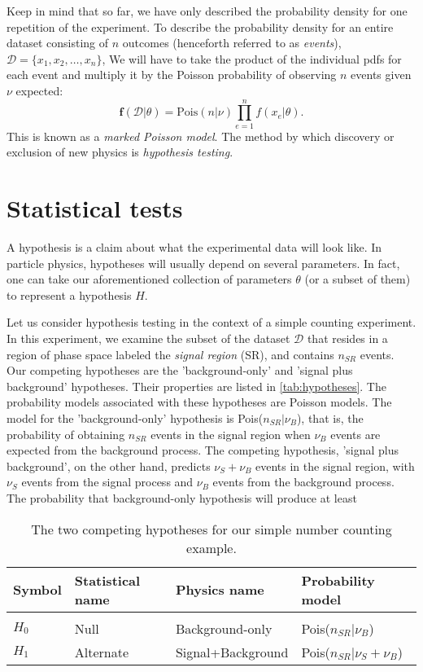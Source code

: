 Keep in mind that so far, we have only described the probability density for one repetition of the experiment. To describe the probability density for an entire dataset consisting of $n$ outcomes (henceforth referred to as \emph{events}), $\mathcal{D} = \{x_1,x_2,\dots,x_n\}$, We will have to take the product of the individual pdfs for each event and multiply it by the Poisson probability of observing $n$ events given $\nu$ expected: 
\[\mathbf{f}(\mathcal{D}|\mathbb{\theta}) = \text{Pois}(n|\nu)\prod_{e=1}^{n}f(x_e|\mathbb{\theta}).\]
This is known as a \emph{marked Poisson model}.
The method by which discovery or exclusion of new physics is \emph{hypothesis testing}. 
\section{Statistical tests}

A hypothesis is a claim about what the experimental data will look like. In particle physics, hypotheses will usually depend on several parameters. In fact, one can take our aforementioned collection of parameters $\mathbb{\theta}$ (or a subset of them) to represent a hypothesis $H$.

Let us consider hypothesis testing in the context of a simple counting experiment. In this experiment, we examine the subset of the dataset $\mathcal{D}$ that resides in a region of phase space labeled the \emph{signal region} (SR), and contains $n_{SR}$ events. Our competing hypotheses are the 'background-only' and 'signal plus background' hypotheses. Their properties are listed in \autoref{tab:hypotheses}. The probability models associated with these hypotheses are Poisson models. The model for the 'background-only' hypothesis is Pois($n_{SR}|\nu_B$), that is, the probability of obtaining $n_{SR}$ events in the signal region when $\nu_B$ events are expected from the background process. The competing hypothesis, 'signal plus background', on the other hand, predicts $\nu_S+\nu_B$ events in the signal region, with $\nu_S$ events from the signal process and $\nu_B$ events from the background process. The probability that background-only hypothesis will produce at least  

\begin{table}
  \begin{tabular}{llll}
    Symbol & Statistical name & Physics name & Probability model\\
    \hline\\
    $H_0$ & Null & Background-only & Pois($n_{SR}|\nu_B$)\\
    $H_1$ & Alternate & Signal+Background & Pois($n_{SR}|\nu_S+\nu_B$)
  \end{tabular}
  \caption{The two competing hypotheses for our simple number counting example.}
  \label{tab:hypotheses}
\end{table}


